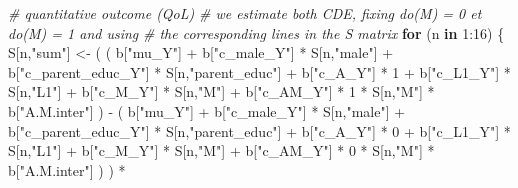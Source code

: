 \documentclass[
]{book}
\newenvironment{Shaded}{\begin{snugshade}}{\end{snugshade}}
\newcommand{\CommentTok}[1]{\textcolor[rgb]{0.56,0.35,0.01}{\textit{#1}}}
\newcommand{\ControlFlowTok}[1]{\textcolor[rgb]{0.13,0.29,0.53}{\textbf{#1}}}
\newcommand{\DecValTok}[1]{\textcolor[rgb]{0.00,0.00,0.81}{#1}}
\newcommand{\NormalTok}[1]{#1}
\newcommand{\OtherTok}[1]{\textcolor[rgb]{0.56,0.35,0.01}{#1}}
\newcommand{\SpecialCharTok}[1]{\textcolor[rgb]{0.00,0.00,0.00}{#1}}
\newcommand{\StringTok}[1]{\textcolor[rgb]{0.31,0.60,0.02}{#1}}
\begin{document}
\begin{Shaded}
\begin{Highlighting}[]
  \CommentTok{\# quantitative outcome (QoL)}
  \CommentTok{\# we estimate both CDE, fixing do(M) = 0 et do(M) = 1 and using }
  \CommentTok{\# the corresponding lines in the S matrix}
  \ControlFlowTok{for}\NormalTok{ (n }\ControlFlowTok{in} \DecValTok{1}\SpecialCharTok{:}\DecValTok{16}\NormalTok{) \{}
\NormalTok{    S[n,}\StringTok{"sum"}\NormalTok{] }\OtherTok{\textless{}{-}}\NormalTok{ ( ( b[}\StringTok{"mu\_Y"}\NormalTok{] }\SpecialCharTok{+} 
\NormalTok{                        b[}\StringTok{"c\_male\_Y"}\NormalTok{] }\SpecialCharTok{*}\NormalTok{ S[n,}\StringTok{"male"}\NormalTok{] }\SpecialCharTok{+} 
\NormalTok{                        b[}\StringTok{"c\_parent\_educ\_Y"}\NormalTok{] }\SpecialCharTok{*}\NormalTok{ S[n,}\StringTok{"parent\_educ"}\NormalTok{] }\SpecialCharTok{+} 
\NormalTok{                        b[}\StringTok{"c\_A\_Y"}\NormalTok{] }\SpecialCharTok{*} \DecValTok{1} \SpecialCharTok{+} 
\NormalTok{                        b[}\StringTok{"c\_L1\_Y"}\NormalTok{] }\SpecialCharTok{*}\NormalTok{ S[n,}\StringTok{"L1"}\NormalTok{] }\SpecialCharTok{+}
\NormalTok{                        b[}\StringTok{"c\_M\_Y"}\NormalTok{] }\SpecialCharTok{*}\NormalTok{ S[n,}\StringTok{"M"}\NormalTok{] }\SpecialCharTok{+}
\NormalTok{                        b[}\StringTok{"c\_AM\_Y"}\NormalTok{] }\SpecialCharTok{*} \DecValTok{1} \SpecialCharTok{*}\NormalTok{ S[n,}\StringTok{"M"}\NormalTok{] }\SpecialCharTok{*}\NormalTok{ b[}\StringTok{"A.M.inter"}\NormalTok{] ) }\SpecialCharTok{{-}} 
\NormalTok{                      ( b[}\StringTok{"mu\_Y"}\NormalTok{] }\SpecialCharTok{+} 
\NormalTok{                          b[}\StringTok{"c\_male\_Y"}\NormalTok{] }\SpecialCharTok{*}\NormalTok{ S[n,}\StringTok{"male"}\NormalTok{] }\SpecialCharTok{+} 
\NormalTok{                          b[}\StringTok{"c\_parent\_educ\_Y"}\NormalTok{] }\SpecialCharTok{*}\NormalTok{ S[n,}\StringTok{"parent\_educ"}\NormalTok{] }\SpecialCharTok{+} 
\NormalTok{                          b[}\StringTok{"c\_A\_Y"}\NormalTok{] }\SpecialCharTok{*} \DecValTok{0} \SpecialCharTok{+} 
\NormalTok{                          b[}\StringTok{"c\_L1\_Y"}\NormalTok{] }\SpecialCharTok{*}\NormalTok{ S[n,}\StringTok{"L1"}\NormalTok{] }\SpecialCharTok{+}
\NormalTok{                          b[}\StringTok{"c\_M\_Y"}\NormalTok{] }\SpecialCharTok{*}\NormalTok{ S[n,}\StringTok{"M"}\NormalTok{] }\SpecialCharTok{+}
\NormalTok{                          b[}\StringTok{"c\_AM\_Y"}\NormalTok{] }\SpecialCharTok{*} \DecValTok{0} \SpecialCharTok{*}\NormalTok{ S[n,}\StringTok{"M"}\NormalTok{] }\SpecialCharTok{*}\NormalTok{ b[}\StringTok{"A.M.inter"}\NormalTok{] ) ) }\SpecialCharTok{*}

\end{Highlighting}
\end{Shaded}
\end{document}
